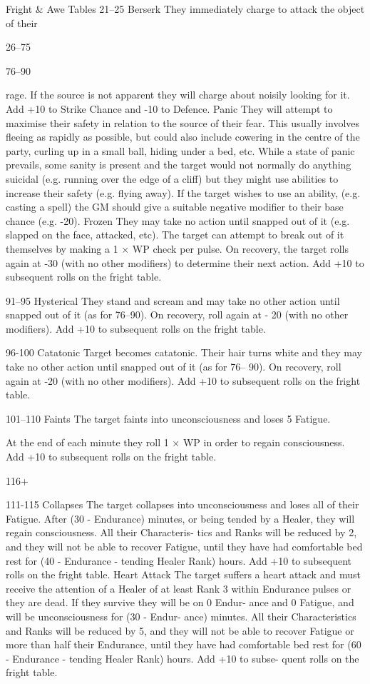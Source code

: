 \begin{Chapter}{Fright \& Awe Tables}
21–25   Berserk They immediately charge to attack the object of their 

26–75  

76–90  

rage. If the source is not apparent they will charge about noisily 
looking for it. Add +10 to Strike Chance and -10 to Defence. 
Panic They will attempt to maximise their safety in relation to the 
source of their fear. This usually involves fleeing as rapidly as 
possible, but could also include cowering in the centre of the 
party, curling up in a small ball, hiding under a bed, etc. While a 
state of panic prevails, some sanity is present and the target would 
not normally do anything suicidal (e.g. running over the edge of a 
cliff) but they might use abilities to increase their safety (e.g. 
flying away). If the target wishes to use an ability, (e.g. casting a 
spell) the GM should give a suitable negative modifier to their 
base chance (e.g. -20). 
Frozen They may take no action until snapped out of it (e.g. 
slapped on the face, attacked, etc). The target can attempt to break 
out of it themselves by making a 1 × WP check per pulse. On 
recovery, the target rolls again at -30 (with no other modifiers) to 
determine their next action. Add +10 to subsequent rolls on the 
fright table. 

91–95   Hysterical They stand and scream and may take no other action 
until snapped out of it (as for 76–90). On recovery, roll again at -
20 (with no other modifiers). Add +10 to subsequent rolls on the 
fright table. 

96-100   Catatonic Target becomes catatonic. Their hair turns white and 
they may take no other action until snapped out of it (as for 76–
90). On recovery, roll again at -20 (with no other modifiers). Add 
+10 to subsequent rolls on the fright table. 

101–110   Faints The target faints into unconsciousness and loses 5 Fatigue. 

At the end of each minute they roll 1 × WP in order to regain 
consciousness. Add +10 to subsequent rolls on the fright table. 

116+  

111-115   Collapses The target collapses into unconsciousness and loses all 
of their Fatigue. After (30 - Endurance) minutes, or being tended 
by a Healer, they will regain consciousness. All their Characteris-
tics and Ranks will be reduced by 2, and they will not be able to 
recover Fatigue, until they have had comfortable bed rest for (40 - 
Endurance - tending Healer Rank) hours. Add +10 to subsequent 
rolls on the fright table. 
Heart Attack The target suffers a heart attack and must receive 
the attention of a Healer of at least Rank 3 within Endurance 
pulses or they are dead. If they survive they will be on 0 Endur-
ance and 0 Fatigue, and will be unconsciousness for (30 - Endur-
ance) minutes. All their Characteristics and Ranks will be reduced 
by 5, and they will not be able to recover Fatigue or more than 
half their Endurance, until they have had comfortable bed rest for 
(60 - Endurance - tending Healer Rank) hours. Add +10 to subse-
quent rolls on the fright table. 


\end{Chapter}

